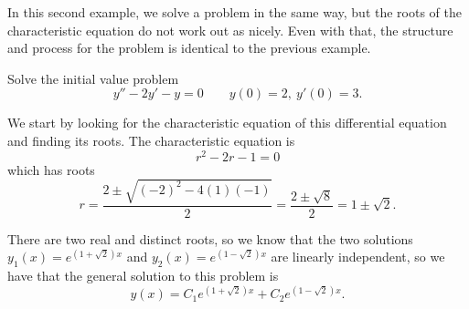 In this second example, we solve a problem in the same way, but the roots of the characteristic equation do not work out as nicely. Even with that, the structure and process for the problem is identical to the previous example.

\begin{example}
Solve the initial value problem 
\begin{equation*}
y'' - 2y' - y = 0 \qquad y(0) = 2,\ y'(0) = 3.
\end{equation*}
\end{example}

\begin{exampleSol}
We start by looking for the characteristic equation of this differential equation and finding its roots. The characteristic equation is
\begin{equation*}
r^2 - 2r - 1 = 0
\end{equation*} which has roots
\begin{equation*}
r = \frac{2 \pm \sqrt{(-2)^2 - 4(1)(-1)}}{2} = \frac{2 \pm \sqrt{8}}{2} = 1 \pm \sqrt{2}.
\end{equation*}

There are two real and distinct roots, so we know that the two solutions $y_1(x) = e^{(1+\sqrt{2})x}$ and $y_2(x) = e^{(1-\sqrt{2})x}$ are linearly independent, so we have that the general solution to this problem is
\begin{equation*}
y(x) = C_1e^{(1+\sqrt{2})x} + C_2e^{(1 - \sqrt{2})x}.
\end{equation*}


\end{exampleSol}
